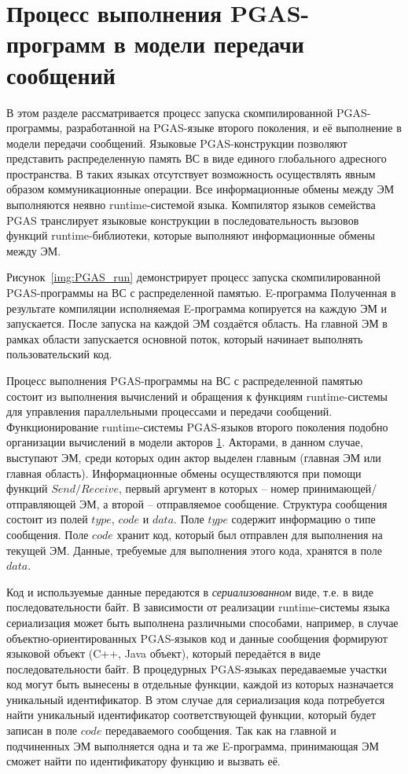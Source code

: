 \section{Процесс выполнения PGAS-программ в модели передачи сообщений}

В этом разделе рассматривается процесс запуска скомпилированной PGAS-программы, разработанной на PGAS-языке второго поколения, и её выполнение в модели передачи сообщений. Языковые PGAS-конструкции позволяют представить распределенную память ВС в виде единого глобального адресного пространства. В таких языках отсутствует возможность осуществлять явным образом коммуникационные операции. Все информационные обмены между ЭМ выполняются неявно runtime-системой языка. Компилятор языков семейства PGAS транслирует языковые конструкции в
последовательность вызовов функций runtime-библиотеки, которые выполняют информационные обмены между ЭМ. 

Рисунок~\ref{img:PGAS_run} демонстрирует процесс запуска скомпилированной PGAS-программы на ВС с распределенной памятью. E-программа Полученная в результате компиляции исполняемая E-программа копируется на каждую ЭМ и запускается. После запуска на каждой ЭМ создаётся область. На главной ЭМ в рамках области запускается основной поток, который начинает выполнять пользовательский код.

Процесс выполнения PGAS-программы на ВС с распределенной памятью состоит из  выполнения вычислений и обращения к функциям runtime-системы для управления параллельными процессами и передачи сообщений. Функционирование runtime-системы PGAS-языков второго поколения подобно организации вычислений в модели акторов \ref{}. Акторами, в данном случае, выступают ЭМ, среди которых один актор выделен главным (главная ЭМ или главная область). Информационные обмены осуществляются при помощи функций $Send/Receive$, первый аргумент в которых -- номер принимающей/отправляющей ЭМ, а второй -- отправляемое сообщение. Структура сообщения состоит из полей $type$, $code$ и $data$. Поле $type$ содержит информацию о типе сообщения. Поле $code$ хранит код, который был отправлен для выполнения на текущей ЭМ. Данные, требуемые для выполнения этого кода, хранятся в поле $data$.

Код и используемые данные передаются в \textit{сериализованном} виде, т.е. в виде последовательности байт. В зависимости от реализации runtime-системы языка сериализация может быть выполнена различными способами, например, в случае объектно-ориентированных PGAS-языков код и данные сообщения формируют языковой объект (C++, Java объект), который передаётся в виде последовательности байт. В процедурных PGAS-языках передаваемые участки код могут быть вынесены в отдельные функции, каждой из которых назначается уникальный идентификатор. В этом случае для сериализация кода потребуется найти уникальный идентификатор соответствующей функции, который будет записан в поле $code$ передаваемого сообщения. Так как на главной и подчиненных ЭМ выполняется одна и та же E-программа, принимающая ЭМ сможет найти по идентификатору функцию и вызвать её.

